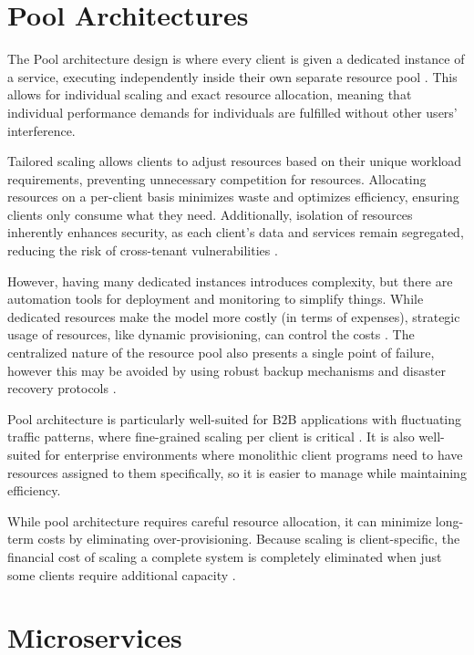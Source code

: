 \documentclass[]{final}
\begin{document}
\section{Pool Architectures}
The Pool architecture design is where every client is given a dedicated instance
of a service, executing independently inside their own separate resource pool \cite{cubet_microservice_nodate}.
This allows for individual scaling and exact resource allocation, meaning that
individual performance demands for individuals are fulfilled without other
users' interference.

Tailored scaling allows clients to adjust resources based on their unique
workload requirements, preventing unnecessary competition for resources.
Allocating resources on a per-client basis minimizes waste and optimizes efficiency,
ensuring clients only consume what they need.
Additionally, isolation of resources inherently enhances security, as each client’s
data and services remain segregated, reducing the risk of cross-tenant
vulnerabilities \cite{cubet_microservice_nodate}.

However, having many dedicated instances introduces complexity, but there are automation
tools for deployment and monitoring to simplify things. While dedicated resources make the model more
costly (in terms of expenses), strategic usage of resources, like dynamic provisioning, can control the costs \cite{cubet_microservice_nodate}. The
centralized nature of the resource pool also presents a single point of failure, however this may be
avoided by using robust backup mechanisms and disaster recovery protocols \cite{cubet_microservice_nodate}.

Pool architecture is particularly well-suited for B2B applications with
fluctuating traffic patterns,
where fine-grained scaling per client is critical \cite{cubet_microservice_nodate}. It is also well-suited
for enterprise environments where monolithic client programs need to have resources
assigned to them specifically, so it is easier to manage while maintaining efficiency.

While pool architecture requires careful resource allocation, it can minimize
long-term costs by eliminating over-provisioning. Because scaling is client-specific,
the financial cost of scaling a complete system is completely eliminated when just some
clients require additional capacity \cite{cubet_microservice_nodate}.

\section{Microservices}
\end{document}
